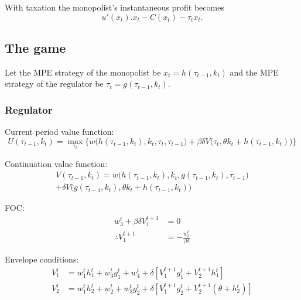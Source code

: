 \documentclass{amsart}
\begin{document}
With taxation the monopolist's instantaneous profit becomes
\begin{equation}
  \label{eq:31}
  u'(x_t).x_t - C(x_t) - \tau_tx_t.
\end{equation}


\subsection{The game}
\label{sec:game}

Let the MPE strategy of the monopolist be $x_t = h(\tau_{t-1},k_t)$
and the MPE strategy of the regulator be $\tau_t = g(\tau_{t-1},k_t)$.

\subsubsection{Regulator}
\label{sec:regulator-1}

Current period value function:
\begin{equation}
  \label{eq:32}
  U(\tau_{t-1},k_t) = \max_{\tau_t} \bigg\{ w\big(
    h(\tau_{t-1},k_t),k_t,\tau_t,\tau_{t-1}\big) + \beta\delta V
  \big( \tau_t,\theta k_t + h(\tau_{t-1},k_t) \big) \bigg\}
\end{equation}

Continuation value function:
\begin{multline}
  \label{eq:33}
  V(\tau_{t-1},k_t) = w\big(
  h(\tau_{t-1},k_t),k_t,g(\tau_{t-1},k_t),\tau_{t-1}\big) \\ +
  \delta V \big( g(\tau_{t-1},k_t),\theta k_t + h(\tau_{t-1},k_t)
  \big)
\end{multline}

FOC:
\begin{align}
  \label{eq:34}
  w^t_3 + \beta\delta V^{t+1}_1  &= 0 \\
  \label{eq:35} \therefore V^{t+1}_1 &= -\frac{w^t_3}{\beta\delta}
\end{align}

Envelope conditions:
\begin{align}
  \label{eq:36}
  V^t_1 &= w^t_1h^t_1 + w^t_3g^t_1 + w^t_4 + \delta \left[
V^{t+1}_1g^t_1 + V^{t+1}_2h^t_1 \right] \\ \label{eq:37}
  V^t_2 &= w^t_1h^t_2 + w^t_2 + w^t_3g^t_2 + \delta \left[
    V^{t+1}_1g^t_2 + V^{t+1}_2 \left( \theta + h^t_2 \right)\right]
\end{align}
\end{document}
